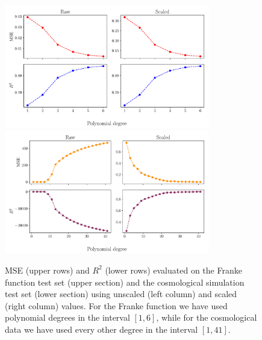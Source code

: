 \documentclass[aps,pra,english,notitlepage,reprint,nofootinbib]{revtex4-1}  %
\begin{document}
\begin{figure}
  \vspace*{-5pt}
  \centering %
  \includegraphics[trim = 0 0.8cm 0 0,clip,width=0.8\textwidth,keepaspectratio]{../figs/a_error_scaled_vs_raw.pdf}
  \centering
  \includegraphics[width=0.8\textwidth]{../figs/g_error_scaled_vs_raw.pdf}
  \caption{MSE (upper rows) and $R^2$ (lower rows) evaluated on the Franke function test set (upper section) and the cosmological simulation test set (lower section) using unscaled (left column) and scaled (right column) values. For the Franke function we have used polynomial degrees in the interval $[1,6]$, while for the cosmological data we have used every other degree in the interval $[1,41]$.}\label{fig:error scaled vs raw}
  \vspace*{-5pt}
\end{figure}

\end{document}
